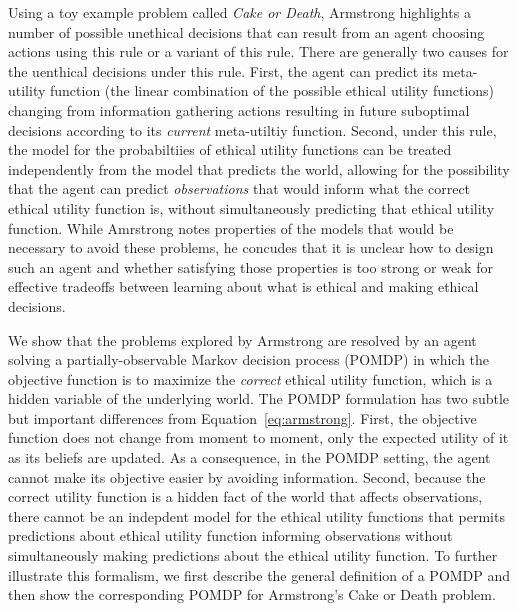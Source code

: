 \documentclass[11pt]{article}
\begin{document}
Using a toy example problem called {\em Cake or Death}, Armstrong highlights a number of possible unethical decisions that can result from an agent choosing actions using this rule or a variant of this rule. There are generally two causes for the uenthical decisions under this rule. First, the agent can predict its meta-utility function (the linear combination of the possible ethical utility functions) changing from information gathering actions resulting in future suboptimal decisions according to its {\em current} meta-utiltiy function. Second, under this rule, the model for the probabiltiies of ethical utility functions can be treated independently from the model that predicts the world, allowing for the possibility that the agent can predict {\em observations} that would inform what the correct ethical utility function is, without simultaneously predicting that ethical utility function. While Amrstrong notes properties of the models that would be necessary to avoid these problems, he concudes that it is unclear how to design such an agent and whether satisfying those properties is too strong or weak for effective tradeoffs between learning about what is ethical and making ethical decisions.



We show that the problems explored by Armstrong are resolved by an agent solving a partially-observable Markov decision process (POMDP) in which the objective function is to maximize the {\em correct} ethical utility function, which is a hidden variable of the underlying world. The POMDP formulation has two subtle but important differences from Equation~\ref{eq:armstrong}. First, the objective function does not change from moment to moment, only the expected utility of it as its beliefs are updated. As a consequence, in the POMDP setting, the agent cannot make its objective easier by avoiding information. Second, because the correct utility function is a hidden fact of the world that affects observations, there cannot be an indepdent model for the ethical utility functions that permits predictions about ethical utility function informing observations without simultaneously making predictions about the ethical utility function. To further illustrate this formalism, we first describe the general definition of a POMDP and then show the corresponding POMDP for Armstrong's Cake or Death problem.
\end{document}
